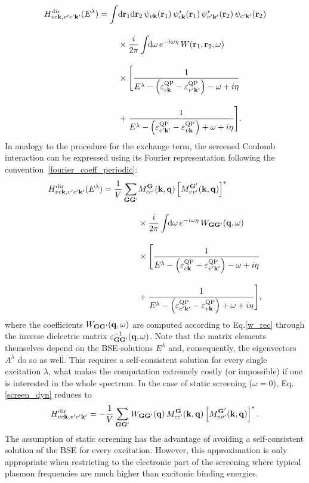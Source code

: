 %
\begin{equation}
\begin{aligned}
     H^\text{dir}_{vc\mathbf{k},v'c'\mathbf{k}'}(E^\lambda) =  \int & \text{d}\mathbf{r}_1\text{d}\mathbf{r}_2\,\psi_{v\mathbf{k}}(\mathbf{r}_1)\,\psi^*_{c\mathbf{k}}(\mathbf{r}_1)\,\psi^*_{v'\mathbf{k}'}(\mathbf{r}_2)\,\psi_{c'\mathbf{k}'}(\mathbf{r}_2)\\[10pt]
     & \times \frac{i}{2\pi}\int\text{\!\!d}\omega\, e^{-i\omega\eta}\,W(\mathbf{r}_1,\mathbf{r}_2,\omega)\\[10pt]
     & \times \Biggl[ \frac{1}{  E^\lambda - \left(\varepsilon^\text{QP}_{c\mathbf{k}} - \varepsilon^\text{QP}_{v'\mathbf{k'}}\right)  - \omega + i\eta }\\[10pt]
     & + \frac{1}{ E^\lambda - \left(\varepsilon^\text{QP}_{c'\mathbf{k'}} - \varepsilon^\text{QP}_{v\mathbf{k}}\right) + \omega +  i\eta}\Biggr].
\end{aligned}
\end{equation}
%
In analogy to the procedure for the exchange term, the screened Coulomb interaction  can be expressed using its Fourier representation following the convention~\eqref{fourier_coeff_periodic}:
%
\begin{equation}\label{screen_dyn}
\begin{aligned}
   H^\text{dir}_{vc\mathbf{k},v'c'\mathbf{k}'}(E^\lambda) =   \frac{1}{V}\sum_{\mathbf{GG'}} & M^{\mathbf{G}}_{cc'}(\mathbf{k,q})\left[M^\mathbf{G'}_{vv'}(\mathbf{k,q})\right]^* \\[10pt]
     & \times \frac{i}{2\pi}\int\text{\!\!d}\omega\, e^{-i\omega\eta}\,W_\mathbf{GG'}(\mathbf{q},\omega)\\[10pt]
     & \times \Biggl[\frac{1}{  E^\lambda - \left(\varepsilon^\text{QP}_{c\mathbf{k}} - \varepsilon^\text{QP}_{v'\mathbf{k'}}\right)  - \omega + i\eta }\\[10pt]
     & + \frac{1}{ E^\lambda - \left(\varepsilon^\text{QP}_{c'\mathbf{k'}} - \varepsilon^\text{QP}_{v\mathbf{k}}\right) + \omega +  i\eta}\Biggr], 
\end{aligned}    
\end{equation}
%
where the coefficients $W_\mathbf{GG'}(\mathbf{q},\omega)$ are computed according to Eq.\;\eqref{w_rec} through the inverse dielectric matrix $\varepsilon^{-1}_\mathbf{GG'}(\mathbf{q},\omega)$. Note that the matrix elements themselves depend on the BSE-solutions $E^\lambda$ and, consequently, the eigenvectors $A^\lambda$ do so as well. This requires a self-consistent solution for every single excitation $\lambda$, what makes the computation extremely costly (or impossible) if one is interested in the whole spectrum.  In the case of static screening ($\omega=0$), Eq.\;\eqref{screen_dyn} reduces to
%
\begin{equation}\label{h_dir_fourier}
      H^\text{dir}_{vc\mathbf{k},v'c'\mathbf{k}'}  = - \frac{1}{V}\sum_{\mathbf{GG'}}W_\mathbf{GG'}(\mathbf{q})\,M^{\mathbf{G}}_{cc'}(\mathbf{k,q})\left[M^\mathbf{G'}_{vv'}(\mathbf{k,q})\right]^*.  
\end{equation}
%
The assumption of static screening has the advantage of avoiding a self-consistent solution of the BSE for every excitation. However, this approximation is only appropriate when restricting to the electronic part of the screening where typical plasmon frequencies are much higher than excitonic binding energies.
  

